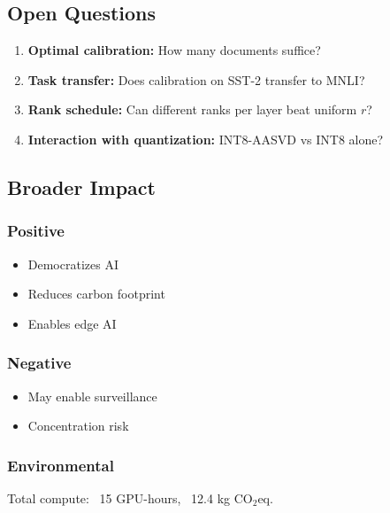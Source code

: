 \subsection{Open Questions}

\begin{enumerate}
\item \textbf{Optimal calibration:} How many documents suffice?
\item \textbf{Task transfer:} Does calibration on SST-2 transfer to MNLI?
\item \textbf{Rank schedule:} Can different ranks per layer beat uniform $r$?
\item \textbf{Interaction with quantization:} INT8-AASVD vs INT8 alone?

\end{enumerate}
\subsection{Broader Impact}

\subsubsection{Positive}
\begin{itemize}
\item Democratizes AI
\item Reduces carbon footprint
\item Enables edge AI

\end{itemize}
\subsubsection{Negative}
\begin{itemize}
\item May enable surveillance
\item Concentration risk

\end{itemize}
\subsubsection{Environmental}
Total compute: ~15 GPU-hours, ~12.4 kg CO$_2$eq.